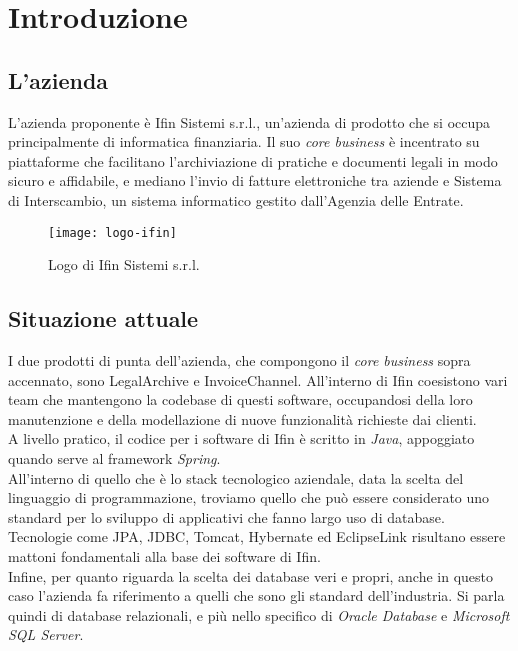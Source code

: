 
\chapter{Introduzione}
\label{cap:introduzione}

\section{L'azienda}

L'azienda proponente è Ifin Sistemi s.r.l., un'azienda di prodotto che si occupa principalmente di informatica finanziaria.
Il suo \textit{core business} è incentrato su piattaforme che facilitano l'archiviazione di pratiche e documenti legali in modo sicuro e affidabile, e mediano l'invio di fatture elettroniche tra aziende e Sistema di Interscambio, un sistema informatico gestito dall'Agenzia delle Entrate.

\vspace{15pt}
\begin{figure}[htbp]
\begin{center}
\texttt{[image: logo-ifin]}
\caption{Logo di Ifin Sistemi s.r.l.}
\end{center}
\end{figure}
\vspace{15pt}

\section{Situazione attuale}

I due prodotti di punta dell'azienda, che compongono il \textit{core business} sopra accennato, sono LegalArchive e InvoiceChannel. All'interno di Ifin coesistono vari team che mantengono la codebase di questi software, occupandosi della loro manutenzione e della modellazione di nuove funzionalità richieste dai clienti.\\
A livello pratico, il codice per i software di Ifin è scritto in \textit{Java}, appoggiato quando serve al framework \textit{Spring}.\\
All'interno di quello che è lo stack tecnologico aziendale, data la scelta del linguaggio di programmazione, troviamo quello che può essere considerato uno standard per lo sviluppo di applicativi che fanno largo uso di database. Tecnologie come \gls{JPA}, \gls{JDBC}, \gls{Tomcat}, \gls{Hybernate} ed \gls{EclipseLink} risultano essere mattoni fondamentali alla base dei software di Ifin.\\
Infine, per quanto riguarda la scelta dei database veri e propri, anche in questo caso l'azienda fa riferimento a quelli che sono gli standard dell'industria. Si parla quindi di database relazionali, e più nello specifico di \textit{Oracle Database} e \textit{Microsoft SQL Server}.\\

